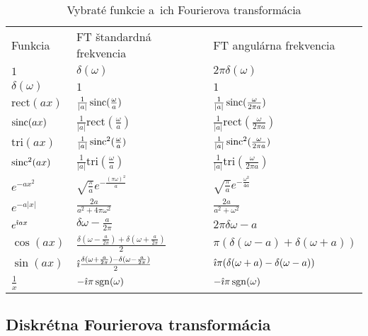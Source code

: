 \begin{table}[htp]
    \centering
    \renewcommand{\arraystretch}{1.5}
    \begin{tabular}{lll}
    Funkcia&FT štandardná frekvencia&FT angulárna frekvencia\\
    $1$&$\delta(\omega)$&$2\pi\delta(\omega)$\\
    $\delta(\omega)$&$1$&$1$\\
    $\text{rect}(ax)$&$\frac{1}{|a|}\operatorname{sinc}(\frac{\omega}{a})$&
               $\frac{1}{|a|}\operatorname{sinc}(\frac{\omega}{2\pi a})$\\
    $\operatorname{sinc}(ax)$&$\frac{1}{|a|}\text{rect}(\frac{\omega}{a})$&
                $\frac{1}{|a|}\text{rect}(\frac{\omega}{2\pi a})$\\
    $\text{tri}(ax)$&$\frac{1}{|a|}\operatorname{sinc}^2(\frac{\omega}{a})$&
               $\frac{1}{|a|}\operatorname{sinc}^2(\frac{\omega}{2\pi a})$\\
    $\operatorname{sinc}^2(ax)$&$\frac{1}{|a|}\text{tri}(\frac{\omega}{a})$&
                $\frac{1}{|a|}\text{tri}(\frac{\omega}{2\pi a})$\\
    $e^{-ax^2}$&$\sqrt{\frac{\pi}{a}} e^{-\frac{(\pi\omega)^2}{a}}$&
                $\sqrt{\frac{\pi}{a}} e^{-\frac{\omega^2}{4a}}$\\
    $e^{-a|x|}$& $\frac{2a}{a^2 + 4\pi\omega^2}$&
                 $\frac{2a}{a^2 + \omega^2}$\\
    $e^{\hat{\imath} a x}$&$\delta{\omega-\frac{a}{2\pi}}$&
                 $2\pi\delta{\omega-a}$\\
    $\cos(ax)$&$\frac{\delta(\omega-\frac{a}{2\pi})+
                      \delta(\omega+\frac{a}{2\pi})}{2}$&
                $\pi (\delta(\omega-a)+\delta(\omega+a))$\\
    $\sin(ax)$&$\hat{\imath}\frac{\delta(\omega+\frac{a}{2\pi})-
                      \delta(\omega-\frac{a}{2\pi})}{2}$&
                $\hat{\imath}\pi (\delta(\omega+a)-\delta(\omega-a))$\\
    $\frac{1}{x}$&$-\hat{\imath}\pi\operatorname{sgn}(\omega)$&
                  $-\hat{\imath}\pi\operatorname{sgn}(\omega)$
    \end{tabular}
    \caption{Vybraté funkcie a~ich Fourierova transformácia}
    \label{tab:fourier_transform_pairs}
    \renewcommand{\arraystretch}{1.0}
\end{table}

\subsection{Diskrétna Fourierova transformácia}


